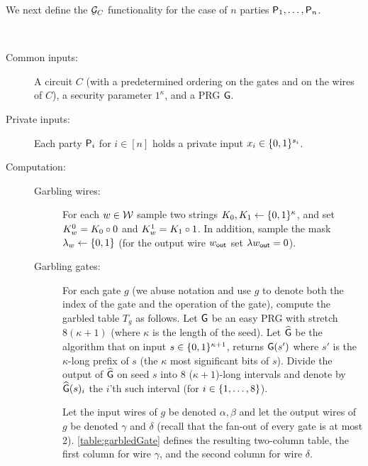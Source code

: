 We next define the ${\mathcal{G}}_{C}$ functionality for the case of $n$ parties $\mathsf{P}_1, \ldots, \mathsf{P}_n$.
\begin{definition}\label{def:Fgc}\
\begin{description}
\item[Common inputs:] A circuit $C$ (with a predetermined ordering on the gates and on the wires of $C$), a security parameter $1^{\kappa}$, and a PRG $\mathsf{G}$.

\item[Private inputs:] Each party $\mathsf{P}_i$ for $i\in[n]$ holds a private input $x_i\in \{0,1\}^{s_i}$.

\item[Computation:]
\begin{description}
    \item [Garbling wires:] For each $w\in{\cal W}$ sample two strings $K_0,K_1\leftarrow\{0,1\}^\kappa$, and set {$K^{0}_w = K_0\circ 0$} and {$K^{1}_w = K_1\circ 1$}. In addition, sample the mask $\lambda_w\leftarrow\{0,1\}$ (for the output wire $w_{\mathsf{out}}$ set $\lambda{w_{\mathsf{out}}}=0$).
    \item [Garbling gates:] 
    For each gate $g$ (we abuse notation and use $g$ to denote both the index of the gate and the operation of the gate), compute the garbled table $T_g$ as follows.
      Let $\mathsf{G}$ be an easy PRG with stretch $8(\kappa+1)$ (where $\kappa$ is the length of the seed). Let $\widehat{\mathsf{G}}$ be the algorithm that on input $s\in\{0,1\}^{\kappa+1}$, returns $\mathsf{G}(s')$ where $s'$ is the $\kappa$-long prefix of $s$ (the $\kappa$ most significant bits of $s$). Divide the output of $\widehat{\mathsf{G}}$ on seed $s$ into $8$ ($\kappa+1$)-long intervals and denote by $\widehat{\mathsf{G}}(s)_i$ the $i$'th such interval (for $i\in\{1,\ldots,8\}$). 
 
 Let the input wires of $g$ be denoted $\alpha,\beta$ and let the output wires of $g$ be denoted $\gamma$ and $\delta$ (recall that the fan-out of every gate is at most 2). \cref{table:garbledGate} defines the resulting two-column table, the first column for wire $\gamma$, and the second column for wire $\delta$.

\end{description}


\end{description}
\end{definition}

